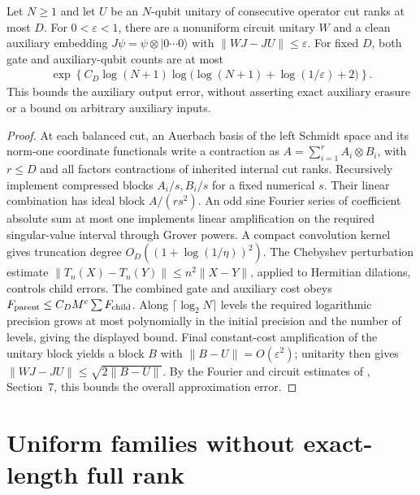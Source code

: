 \begin{lemma}
    \label{thm:mpu_general_quasipolynomial_approximation}
    Let $N\geq1$ and let $U$ be an $N$-qubit unitary of consecutive
    operator cut ranks at most $D$. For $0<\varepsilon<1$, there are
    a nonuniform circuit unitary $W$ and a clean auxiliary embedding
    $J\psi=\psi\otimes|0\cdots0\rangle$ with
    $\|WJ-JU\|\leq\varepsilon$.
    For fixed $D$, both gate and auxiliary-qubit counts are at most
    \begin{align}
        \exp\!\left\{C_D\log(N+1)
        \log\bigl(\log(N+1)+\log(1/\varepsilon)+2\bigr)\right\}.
    \end{align}
    This bounds the auxiliary output error, without asserting exact
    auxiliary erasure or a bound on arbitrary auxiliary inputs.
\end{lemma}
\begin{proof}
    At each balanced cut, an Auerbach basis of the left Schmidt space
    and its norm-one coordinate functionals write a contraction as
    $A=\sum_{i=1}^r A_i\otimes B_i$, with $r\leq D$ and all factors
    contractions of inherited internal cut ranks.
    Recursively implement compressed blocks $A_i/s,B_i/s$ for a fixed
    numerical $s$. Their linear combination has ideal block
    $A/(rs^2)$. An odd sine Fourier series of coefficient absolute
    sum at most one implements linear amplification on the required
    singular-value interval through Grover powers. A compact convolution
    kernel gives truncation degree $O_D((1+\log(1/\eta))^2)$.
    The Chebyshev perturbation estimate
    $\|T_n(X)-T_n(Y)\|\leq n^2\|X-Y\|$, applied to Hermitian dilations,
    controls child errors. The combined gate and auxiliary cost obeys
    $F_{\rm parent}\leq C_D M^c\sum F_{\rm child}$.
    Along $\lceil\log_2N\rceil$ levels the required logarithmic
    precision grows at most polynomially in the initial precision
    and the number of levels, giving the displayed bound.
    Final constant-cost amplification of the unitary block yields
    a block $B$ with $\|B-U\|=O(\varepsilon^2)$; unitarity then gives
    $\|WJ-JU\|\leq\sqrt{2\|B-U\|}$.
    By the Fourier and circuit estimates of
    \cite{MPUSchmidtObstructions2026}, Section~7, this bounds the overall approximation error.
\end{proof}

\section{Uniform families without exact-length full rank}

